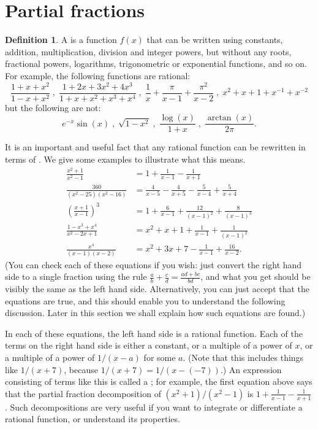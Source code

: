 \documentclass[a4paper]{book}
\theoremstyle{definition}
\newtheorem{definition}[theorem]{Definition}
\begin{document}
\section{Partial fractions}
\label{sec-part-frac}

\begin{definition}
 A  is a function $f(x)$ that can be written
 using constants, addition, multiplication, division and integer
 powers, but without any roots, fractional powers, logarithms,
 trigonometric or exponential functions, and so on.  For example, the
 following functions are rational:
 \[ \frac{1+x+x^2}{1-x+x^2} \;,\;
    \frac{1+2x+3x^2+4x^3}{1+x+x^2+x^3+x^4} \;,\;
    \frac{1}{x} + \frac{\pi}{x-1} + \frac{\pi^2}{x-2} \;,\;
    x^2+x+1+x^{-1}+x^{-2}
 \]
 but the following are not:
 \[ e^{-x}\sin(x) \;,\; \sqrt{1-x^2} \;,\; \frac{\log(x)}{1+x}
    \;,\; \frac{\arctan(x)}{2\pi}.
 \] 
\end{definition}

It is an important and useful fact that any rational function can be
rewritten in terms of .  We give some examples
to illustrate what this means.
\begin{align*}
  \frac{x^2+1}{x^2-1}
   &= 1 + \frac{1}{x-1} - \frac{1}{x+1} \\
  \frac{360}{(x^2-25)(x^2-16)}
   &= \frac{4}{x-5} - \frac{4}{x+5} - \frac{5}{x-4} + \frac{5}{x+4} \\
  \left(\frac{x+1}{x-1}\right)^3
   &= 1 + \frac{6}{x-1} + \frac{12}{(x-1)^2} + \frac{8}{(x-1)^3} \\
  \frac{1-x^3+x^4}{x^2-2x+1}
   &= x^2 + x + 1 + \frac{1}{x-1} + \frac{1}{(x-1)^2} \\
  \frac{x^4}{(x-1)(x-2)}
   &= x^2 + 3x + 7 - \frac{1}{x-1} + \frac{16}{x-2}.
\end{align*}
(You can check each of these equations if you wish: just convert the
right hand side to a single fraction using the rule
$\frac{a}{b}+\frac{c}{d}=\frac{ad+bc}{bd}$, and what you get should be
visibly the same as the left hand side.  Alternatively, you can just
accept that the equations are true, and this should enable you to
understand the following discussion.  Later in this section we shall
explain how such equations are found.)

In each of these equations, the left hand side is a rational function.
Each of the terms on the right hand side is either a constant, or a
multiple of a power of $x$, or a multiple of a power of $1/(x-a)$ for
some $a$.  (Note that this includes things like $1/(x+7)$, because
$1/(x+7)=1/(x-(-7))$.)  An expression consisting of terms like this is
called a ; for example, the first
equation above says that the partial fraction decomposition of
$(x^2+1)/(x^2-1)$ is $1+\frac{1}{x-1}-\frac{1}{x+1}$.  Such
decompositions are very useful if you want to integrate or
differentiate a rational function, or understand its properties.
\end{document}
